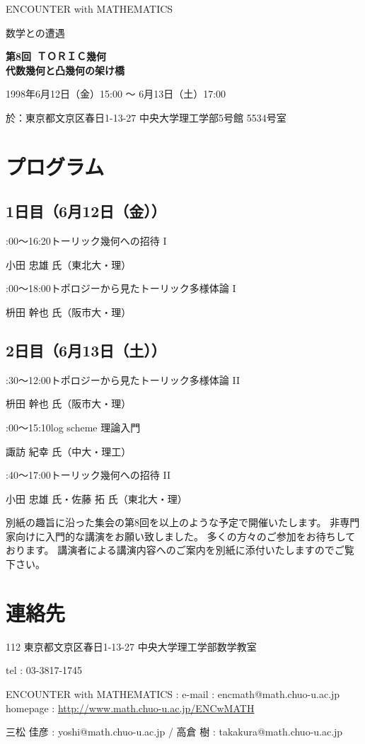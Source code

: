 \documentclass[uplatex,dvipdfmx]{jlreq}
\newcommand{\talk}[3]{%
\noindent
#1\quad #2\par
\hspace*{2em}#3\par\smallskip
}
\newcommand{\EwMnumber}{第8回}
\newcommand{\EwMtitle}{ＴＯＲＩＣ幾何\\[2mm]\large 代数幾何と凸幾何の架け橋}
\newcommand{\EwMdate}{1998年6月12日（金）15:00 ～ 6月13日（土）17:00}
\newcommand{\EwMplace}{東京都文京区春日1-13-27 中央大学理工学部5号館 5534号室}
\newcommand{\EwMtitleblock}{

\vspace*{-5mm}

\begin{center}

{\Large ENCOUNTER with MATHEMATICS}

\vspace{2mm}

{\large 数学との遭遇}

\vspace{4mm}

{\Large \bfseries \EwMnumber\ \EwMtitle}

\vspace{4mm}

\EwMdate

\vspace{2mm}

於：\EwMplace

\end{center}

\vspace{3mm}

\vspace{2mm}

}
\begin{document}
\EwMtitleblock


\section*{プログラム}

\subsection*{1日目（6月12日（金））}

\talk
{15:00～16:20}
{トーリック幾何への招待 I}
{小田 忠雄 氏（東北大・理）}

\talk
{17:00～18:00}
{トポロジーから見たトーリック多様体論 I}
{枡田 幹也 氏（阪市大・理）}

\subsection*{2日目（6月13日（土））}

\talk
{10:30～12:00}
{トポロジーから見たトーリック多様体論 II}
{枡田 幹也 氏（阪市大・理）}

\talk
{14:00～15:10}
{log scheme 理論入門}
{諏訪 紀幸 氏（中大・理工）}

\talk
{15:40～17:00}
{トーリック幾何への招待 II}
{小田 忠雄 氏・佐藤 拓 氏（東北大・理）}


\bigskip

別紙の趣旨に沿った集会の第8回を以上のような予定で開催いたします。  
非専門家向けに入門的な講演をお願い致しました。  
多くの方々のご参加をお待ちしております。  
講演者による講演内容へのご案内を別紙に添付いたしますのでご覧下さい。


\section*{連絡先}

112 東京都文京区春日1-13-27 中央大学理工学部数学教室  

tel : 03-3817-1745  

ENCOUNTER with MATHEMATICS : e-mail : encmath@math.chuo-u.ac.jp  
homepage : \url{http://www.math.chuo-u.ac.jp/ENCwMATH}  

三松 佳彦 : yoshi@math.chuo-u.ac.jp / 高倉 樹 : takakura@math.chuo-u.ac.jp
\end{document}
